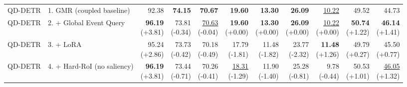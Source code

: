 \documentclass{article}
\begin{document}
{\begin{tabular}{llrrrrrrrrr}
\midrule
QD-DETR & 1. GMR (coupled baseline) & 92.38 & \textbf{74.15} & \textbf{70.67} & \textbf{19.60} & \textbf{13.30} & \textbf{26.09} & \underline{10.22} & 49.52 & 44.73 \\
QD-DETR & 2. + Global Event Query & \shortstack{\textbf{96.19} \\ {\scriptsize (+3.81)}} & \shortstack{73.81 \\ {\scriptsize (-0.34)}} & \shortstack{\underline{70.63} \\ {\scriptsize (-0.04)}} & \shortstack{\textbf{19.60} \\ {\scriptsize (+0.00)}} & \shortstack{\textbf{13.30} \\ {\scriptsize (+0.00)}} & \shortstack{\textbf{26.09} \\ {\scriptsize (+0.00)}} & \shortstack{\underline{10.22} \\ {\scriptsize (+0.00)}} & \shortstack{\textbf{50.74} \\ {\scriptsize (+1.22)}} & \shortstack{\textbf{46.14} \\ {\scriptsize (+1.41)}} \\
QD-DETR & 3. + LoRA & \shortstack{95.24 \\ {\scriptsize (+2.86)}} & \shortstack{73.73 \\ {\scriptsize (-0.42)}} & \shortstack{70.18 \\ {\scriptsize (-0.49)}} & \shortstack{17.79 \\ {\scriptsize (-1.81)}} & \shortstack{11.48 \\ {\scriptsize (-1.82)}} & \shortstack{23.77 \\ {\scriptsize (-2.32)}} & \shortstack{\textbf{11.48} \\ {\scriptsize (+1.26)}} & \shortstack{49.79 \\ {\scriptsize (+0.27)}} & \shortstack{45.50 \\ {\scriptsize (+0.77)}} \\
QD-DETR & 4. + Hard-RoI (no saliency) & \shortstack{\textbf{96.19} \\ {\scriptsize (+3.81)}} & \shortstack{73.44 \\ {\scriptsize (-0.71)}} & \shortstack{70.26 \\ {\scriptsize (-0.41)}} & \shortstack{\underline{18.31} \\ {\scriptsize (-1.29)}} & \shortstack{11.90 \\ {\scriptsize (-1.40)}} & \shortstack{25.28 \\ {\scriptsize (-0.81)}} & \shortstack{9.78 \\ {\scriptsize (-0.44)}} & \shortstack{50.53 \\ {\scriptsize (+1.01)}} & \shortstack{\underline{46.05} \\ {\scriptsize (+1.32)}} \\

\end{tabular}}
\end{document}
